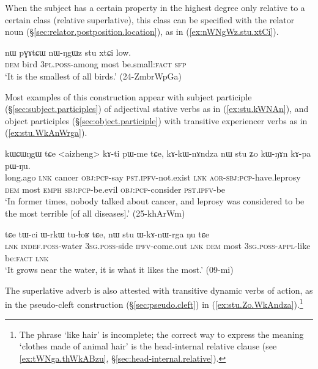 When the subject has a certain property in the highest degree only relative to a certain class (relative superlative), this class can be specified with the relator noun  (§\ref{sec:relator.postposition.location}), as in  (\ref{ex:nWNgWz.stu.xtCi}).

 
\begin{exe}
\ex \label{ex:nWNgWz.stu.xtCi}
\gll nɯ pɣɤtɕɯ nɯ-ŋgɯz stu xtɕi low.\\
\textsc{dem} bird \textsc{3pl}.\textsc{poss}-among most be.small:\textsc{fact} \textsc{sfp} \\
\glt `It is the smallest of all birds.' (24-ZmbrWpGa)
\end{exe}

Most examples of this construction appear with subject participle (§\ref{sec:subject.participles}) of adjectival stative verbs as in (\ref{ex:stu.kWNAn}), and object participles (§\ref{sec:object.participle}) with transitive experiencer verbs as in (\ref{ex:stu.WkAnWrga}).

\begin{exe}
\ex \label{ex:stu.kWNAn}
\gll kɯɕɯŋgɯ tɕe <aizheng> kɤ-ti pɯ-me tɕe, kɤ-kɯ-nɤndza nɯ stu ʑo kɯ-ŋɤn kɤ-pa pɯ-ŋu.  \\
long.ago \textsc{lnk} cancer \textsc{obj}:\textsc{pcp}-say \textsc{pst}.\textsc{ipfv}-not.exist \textsc{lnk} \textsc{aor}-\textsc{sbj}:\textsc{pcp}-have.leprosy \textsc{dem} most \textsc{emph} \textsc{sbj}:\textsc{pcp}-be.evil \textsc{obj}:\textsc{pcp}-consider \textsc{pst}.\textsc{ipfv}-be \\
\glt `In former times, nobody talked about cancer, and leprosy was considered to be the most terrible [of all diseases].' (25-khArWm)
\end{exe}

\begin{exe}
\ex \label{ex:stu.WkAnWrga}
\gll tɕe tɯ-ci ɯ-rkɯ tu-ɬoʁ tɕe, nɯ stu ɯ-kɤ-nɯ-rga ŋu tɕe \\
\textsc{lnk} \textsc{indef}.\textsc{poss}-water \textsc{3sg}.\textsc{poss}-side \textsc{ipfv}-come.out \textsc{lnk} \textsc{dem} most \textsc{3sg}.\textsc{poss}-\textsc{appl}-like be:\textsc{fact} \textsc{lnk} \\
\glt `It grows near the water, it is what it likes the most.' (09-mi)
\end{exe}

The superlative adverb is also attested with transitive dynamic verbs of action, as in the pseudo-cleft construction (§\ref{sec:pseudo.cleft}) in (\ref{ex:stu.Zo.WkAndza}).\footnote{The phrase  `like hair' is incomplete; the correct way to express the meaning `clothes made of animal hair' is the head-internal relative clause  (see \ref{ex:tWNga.thWkABzu}, §\ref{sec:head-internal.relative}).} 

